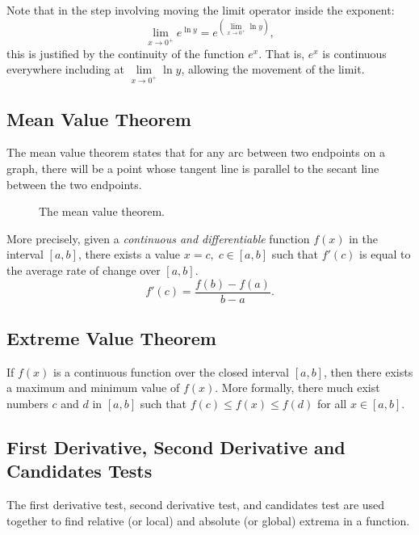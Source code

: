 \noindent Note that in the step involving moving the limit operator inside the exponent:
\[ \lim_{x \to 0^+} e^{\ln y} = e^{\left( \lim \limits_{x \to 0^+} \ln y \right)}, \]
this is justified by the continuity of the function $e^x$. That is, $e^x$ is continuous everywhere including at $\lim \limits_{x \to 0^+} \ln y$, allowing the movement of the limit.

\subsection{Mean Value Theorem}
The mean value theorem states that for any arc between two endpoints on a graph, there will be a point whose tangent line is parallel to the secant line between the two endpoints.

\begin{figure}[H]
	\centering
	\caption{The mean value theorem.}
	\label{fig:mean_value_theorem}
\end{figure}

More precisely, given a \textit{continuous and differentiable} function $f(x)$ in the interval $[a, b]$, there exists a value $x = c, \; c \in [a, b]$ such that $f'(c)$ is equal to the average rate of change over $[a, b]$.
\[ f'(c) = \frac{f(b) - f(a)}{b - a}. \]

\subsection{Extreme Value Theorem}
If $f(x)$ is a continuous function over the closed interval $[a, b]$, then there exists a maximum and minimum value of $f(x)$. More formally, there much exist numbers $c$ and $d$ in $[a, b]$ such that $f(c) \leq f(x) \leq f(d)$ for all $x \in [a, b]$.

\subsection{First Derivative, Second Derivative and Candidates Tests}
The first derivative test, second derivative test, and candidates test are used together to find relative (or local) and absolute (or global) extrema in a function.

